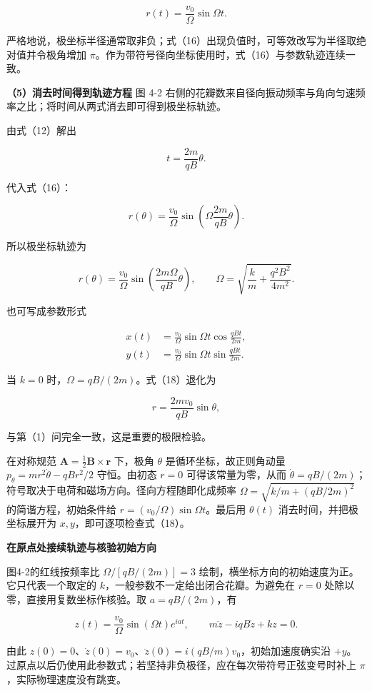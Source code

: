 \documentclass[12pt,a4paper,UTF8]{ctexart}
\begin{document}
\[\boxed{r(t)=\frac{v_0}{\Omega}\sin\Omega t}.\]

严格地说，极坐标半径通常取非负；式（16）出现负值时，可等效改写为半径取绝对值并令极角增加
\(\pi\)。作为带符号径向坐标使用时，式（16）与参数轨迹连续一致。

\textbf{（5）消去时间得到轨迹方程} 图 4-2
右侧的花瓣数来自径向振动频率与角向匀速频率之比；将时间从两式消去即可得到极坐标轨迹。

由式（12）解出

\[t=\frac{2m}{qB}\theta.\]

代入式（16）：

\[r(\theta)=\frac{v_0}{\Omega}
\sin\left(\Omega\frac{2m}{qB}\theta\right).\]

所以极坐标轨迹为

\[\boxed{
r(\theta)=\frac{v_0}{\Omega}
\sin\left(\frac{2m\Omega}{qB}\theta\right),
\qquad
\Omega=\sqrt{\frac km+\frac{q^2B^2}{4m^2}}
}.\]

也可写成参数形式

\[\boxed{
\begin{aligned}
x(t)&=\frac{v_0}{\Omega}\sin\Omega t
\cos\frac{qBt}{2m},\\
y(t)&=\frac{v_0}{\Omega}\sin\Omega t
\sin\frac{qBt}{2m}.
\end{aligned}}\]

当 \(k=0\) 时，\(\Omega=qB/(2m)\)。式（18）退化为

\[r=\frac{2mv_0}{qB}\sin\theta,\]

与第（1）问完全一致，这是重要的极限检验。

在对称规范 \(\bm A=\tfrac12\bm B\times\bm r\) 下，极角 \(\theta\)
是循环坐标，故正则角动量 \(p_\theta=mr^2\dot\theta-qBr^2/2\)
守恒。由初态 \(r=0\) 可得该常量为零，从而
\(\dot\theta=qB/(2m)\)；符号取决于电荷和磁场方向。径向方程随即化成频率
\(\Omega=\sqrt{k/m+(qB/2m)^2}\) 的简谐方程，初始条件给
\(r=(v_0/\Omega)\sin\Omega t\)。最后用 \(\theta(t)\)
消去时间，并把极坐标展开为 \(x,y\)，即可逐项检查式（18）。

\textbf{在原点处接续轨迹与核验初始方向}

图4-2的红线按频率比 \(\Omega/[qB/(2m)]=3\)
绘制，横坐标方向的初始速度为正。它只代表一个取定的
\(k\)，一般参数不一定给出闭合花瓣。为避免在 \(r=0\)
处除以零，直接用复数坐标作核验。取 \(a=qB/(2m)\)，有

\[z(t)=\frac{v_0}{\Omega}\sin(\Omega t)e^{iat},\qquad
m\ddot z-iqB\dot z+kz=0.\]

由此
\(z(0)=0\)、\(\dot z(0)=v_0\)、\(\ddot z(0)=i(qB/m)v_0\)，初始加速度确实沿
\(+y\)。过原点以后仍使用此参数式；若坚持非负极径，应在每次带符号正弦变号时补上
\(\pi\)，实际物理速度没有跳变。
\end{document}
